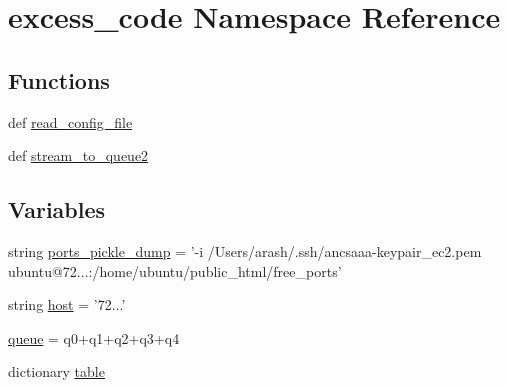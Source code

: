 \hypertarget{namespaceexcess__code}{\section{excess\-\_\-code Namespace Reference}
\label{namespaceexcess__code}
}
\subsection*{Functions}
\begin{DoxyCompactItemize}
\item 
def \hyperlink{namespaceexcess__code_a444ba0995cd870f581f9de7114587958}{read\-\_\-config\-\_\-file}
\item 
def \hyperlink{namespaceexcess__code_ad14739fab5c295bd8507c3fd0c455c95}{stream\-\_\-to\-\_\-queue2}
\end{DoxyCompactItemize}
\subsection*{Variables}
\begin{DoxyCompactItemize}
\item 
string \hyperlink{namespaceexcess__code_ad482d3963c307055389db29a0d9b9725}{ports\-\_\-pickle\-\_\-dump} = '-\/i /Users/arash/.ssh/ancsaaa-\/keypair\-\_\-ec2.\-pem ubuntu@72...\-:/home/ubuntu/public\-\_\-html/free\-\_\-ports'
\item 
string \hyperlink{namespaceexcess__code_a7b2d2af5fa2f9fb9bf672bd07044add1}{host} = '72...'
\item 
\hyperlink{namespaceexcess__code_ad9642f3ca12ca84caed8a65645ba6688}{queue} = q0+q1+q2+q3+q4
\item 
dictionary \hyperlink{namespaceexcess__code_ac888a34cdc4f20d89623cfe2f3b2727d}{table}
\end{DoxyCompactItemize}


